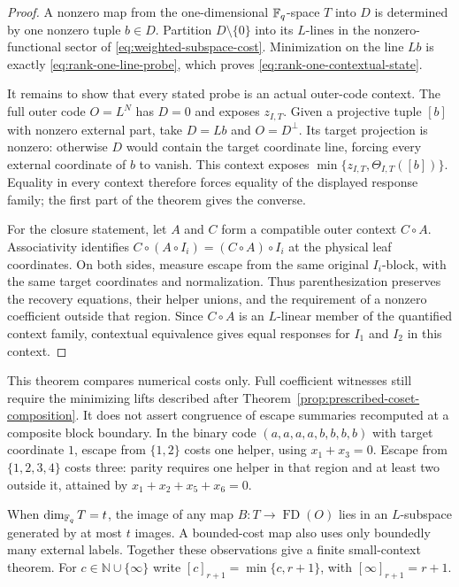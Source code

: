 \begin{proof}
A nonzero map from the one-dimensional $\mathbb F_q$-space $T$ into $D$ is determined
by one nonzero tuple $b\in D$.  Partition $D\setminus\{0\}$ into its
$L$-lines in the nonzero-functional sector of
\eqref{eq:weighted-subspace-cost}.  Minimization on the line $Lb$ is exactly
\eqref{eq:rank-one-line-probe}, which proves
\eqref{eq:rank-one-contextual-state}.

It remains to show that every stated probe is an actual outer-code context.
The full outer code $O=L^N$ has $D=0$ and exposes $z_{I,T}$.  Given a
projective tuple $[b]$ with nonzero external part, take
$D=Lb$ and $O=D^\perp$.  Its target projection is nonzero: otherwise
$D$ would contain the target coordinate line, forcing every external
coordinate of $b$ to vanish.  This context exposes
$\min\{z_{I,T},\Theta_{I,T}([b])\}$.  Equality in every context therefore
forces equality of the displayed response family; the first part of the
theorem gives the converse.

For the closure statement, let $A$ and $C$ form a compatible outer context
$C\circ A$.  Associativity identifies
$C\circ(A\circ I_i)=(C\circ A)\circ I_i$ at the physical leaf coordinates.
On both sides, measure escape from the same original $I_i$-block, with the
same target coordinates and normalization.  Thus parenthesization preserves
the recovery equations, their helper unions, and the requirement of a nonzero
coefficient outside that region.  Since $C\circ A$ is an $L$-linear member
of the quantified context family, contextual equivalence gives equal responses
for $I_1$ and $I_2$ in this context.
%
%
\end{proof}

This theorem compares numerical costs only.  Full coefficient witnesses still
require the minimizing lifts described after
Theorem~\ref{prop:prescribed-coset-composition}.
It does not assert congruence of escape summaries recomputed at a composite
block boundary.  In the binary code $(a,a,a,a,b,b,b,b)$ with target coordinate
$1$, escape from $\{1,2\}$ costs one helper, using $x_1+x_3=0$.
Escape from $\{1,2,3,4\}$ costs three: parity requires one helper in that
region and at least two outside it, attained by $x_1+x_2+x_5+x_6=0$.

When $\dim_{\mathbb F_q}T=t$, the image of any map
$B:T\to\operatorname{FD}(O)$ lies in an $L$-subspace
generated by at most $t$ images.  A bounded-cost map also uses only boundedly
many external labels.  Together these observations give a finite
small-context theorem.  For $c\in\mathbb N\cup\{\infty\}$ write
$[c]_{r+1}=\min\{c,r+1\}$, with $[\infty]_{r+1}=r+1$.

